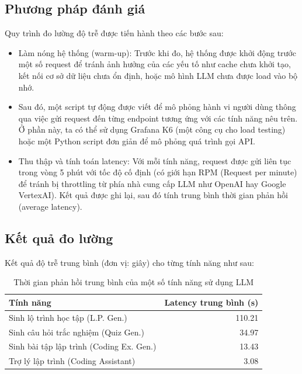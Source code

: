 \subsection{Phương pháp đánh giá}

Quy trình đo lường độ trễ được tiến hành theo các bước sau:

\begin{itemize}
    \item Làm nóng hệ thống (warm-up): Trước khi đo, hệ thống được khởi động trước một số request để tránh ảnh hưởng của các yếu tố như cache chưa khởi tạo, kết nối cơ sở dữ liệu chưa ổn định, hoặc mô hình LLM chưa được load vào bộ nhớ.
    
    \item Sau đó, một script tự động được viết để mô phỏng hành vi người dùng thông qua việc gửi request đến từng endpoint tương ứng với các tính năng nêu trên. Ở phần này, ta có thể sử dụng Grafana K6 (một công cụ cho load testing) hoặc một Python script đơn giản để mô phỏng quá trình gọi API. 

    \item Thu thập và tính toán latency: Với mỗi tính năng, request được gửi liên tục trong vòng 5 phút với tốc độ cố định (có giới hạn RPM (Request per minute) để tránh bị throttling từ phía nhà cung cấp LLM như OpenAI hay Google VertexAI). Kết quả được ghi lại, sau đó tính trung bình thời gian phản hồi (average latency).
\end{itemize}

\subsection{Kết quả đo lường}

Kết quả độ trễ trung bình (đơn vị: giây) cho từng tính năng như sau:

\begin{table}[H]
\centering
\begin{tabular}{l r}
\toprule
\textbf{Tính năng} & \textbf{Latency trung bình (s)} \\
\midrule
Sinh lộ trình học tập (L.P. Gen.) & 110.21 \\
Sinh câu hỏi trắc nghiệm (Quiz Gen.) & 34.97 \\
Sinh bài tập lập trình (Coding Ex. Gen.) & 13.43 \\
Trợ lý lập trình (Coding Assistant) & 3.08 \\
\bottomrule
\end{tabular}
\caption{Thời gian phản hồi trung bình của một số tính năng sử dụng LLM}
\end{table}

